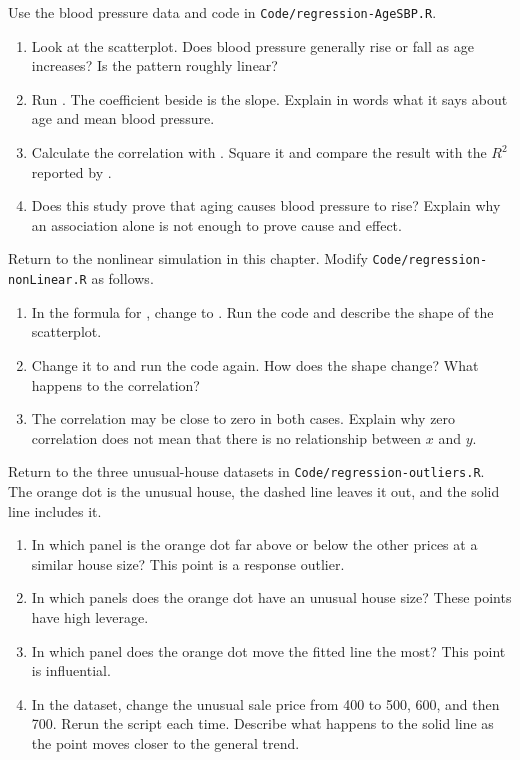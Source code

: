 \begin{exercise}
Use the blood pressure data and code in
\lstinline{Code/regression-AgeSBP.R}.
\begin{enumerate}
  \item Look at the scatterplot. Does blood pressure generally rise or fall as
    age increases? Is the pattern roughly linear?
  \item Run . The coefficient beside  is the
    slope. Explain in words what it says about age and mean blood pressure.
  \item Calculate the correlation with . Square
    it and compare the result with the $R^2$ reported by .
  \item Does this study prove that aging causes blood pressure to rise? Explain
    why an association alone is not enough to prove cause and effect.
\end{enumerate}
\end{exercise}

\begin{exercise}
Return to the nonlinear simulation in this chapter. Modify
\lstinline{Code/regression-nonLinear.R} as follows.
\begin{enumerate}
  \item In the formula for , change  to
    . Run the code and describe the shape of the scatterplot.
  \item Change it to  and run the code again. How does the shape
    change? What happens to the correlation?
  \item The correlation may be close to zero in both cases. Explain why zero
    correlation does not mean that there is no relationship between $x$ and
    $y$.
\end{enumerate}
\end{exercise}

\begin{exercise}
Return to the three unusual-house datasets in
\lstinline{Code/regression-outliers.R}. The orange dot is the unusual house,
the dashed line leaves it out, and the solid line includes it.
\begin{enumerate}
  \item In which panel is the orange dot far above or below the other prices at
    a similar house size? This point is a response outlier.
  \item In which panels does the orange dot have an unusual house size? These
    points have high leverage.
  \item In which panel does the orange dot move the fitted line the most? This
    point is influential.
  \item In the  dataset, change the unusual sale price from
    400 to 500, 600, and then 700. Rerun the script each time. Describe what
    happens to the solid line as the point moves closer to the general trend.
\end{enumerate}
\end{exercise}

